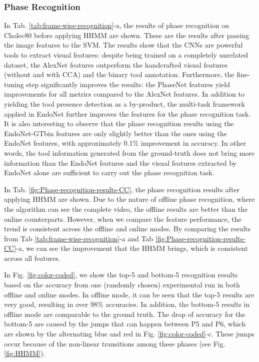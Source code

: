 \documentclass[journal]{IEEEtran} \usepackage{amssymb}
\begin{document}
\subsubsection{\textbf{Phase Recognition}} In Tab. \ref{tab:frame-wise-recognition}-a, the results of phase recognition on Cholec80 before applying HHMM are shown. These are the results after passing the image features to the SVM. The results show that the CNNs are powerful tools to extract visual
features: despite being trained on a
completely unrelated dataset, the AlexNet features outperform the handcrafted visual 
features (without and with CCA) and the binary tool annotation. Furthermore, the
fine-tuning step significantly improves the results: the PhaseNet features yield improvements for all metrics compared to the AlexNet features. In addition to yielding the tool presence detection as a by-product, the multi-task framework
applied in EndoNet further improves the features for the phase recognition task. It is also interesting to observe that the phase recognition results using the EndoNet-GTbin features are only slightly better than the ones using the EndoNet features, with approximately 0.1\% improvement in accuracy. In other words, the tool information generated from the ground-truth does not bring more information than the EndoNet features and the visual features extracted by EndoNet alone are sufficient to carry out the phase recognition task.

In Tab. \ref{fig:Phase-recognition-results-CC}, the phase recognition
results after applying HHMM are shown. Due to the
nature of offline phase recognition, where the algorithm can see the complete video, 
the offline results are better
than the online counterparts. However, when we compare the feature performance,
the trend is consistent across the offline and online modes. By comparing the results from Tab \ref{tab:frame-wise-recognition}-a and Tab \ref{fig:Phase-recognition-results-CC}-a, we can see the improvement that the HHMM brings, which is consistent across all features.

In Fig. \ref{fig:color-coded}, we show the top-5 and bottom-5 recognition results based on the accuracy from one (randomly chosen) experimental run in both offline and online modes. In offline mode, it can be seen that the top-5 results are very good, resulting in over 98\% accuracies. In addition, the bottom-5 results in offline mode are comparable to the ground truth. The drop of accuracy for the bottom-5 are caused by the jumps that can happen between P5 and P6, which are shown by the alternating blue and red in Fig. \ref{fig:color-coded}-c.  These jumps occur because of the non-linear transitions among these phases (see Fig. \ref{fig:HHMM}).
\end{document}
